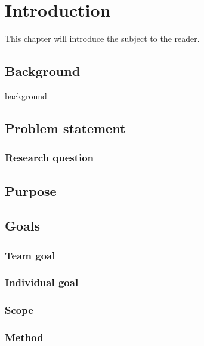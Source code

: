 \chapter{Introduction}
\label{sec:introduction}
This chapter will introduce the subject to the reader.

\section{Background}
background ~\cite{zaki2016}

\section{Problem statement}

\subsection{Research question}

\section{Purpose}

\section{Goals}

\subsection{Team goal}

\subsection{Individual goal}

\subsection{Scope}

\subsection{Method}
